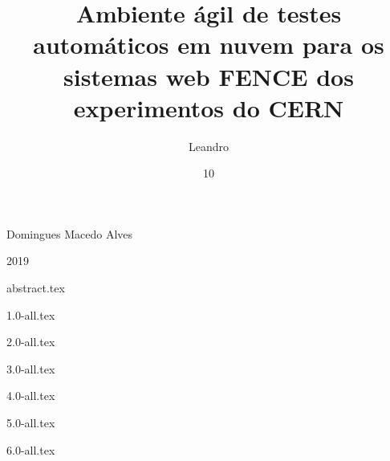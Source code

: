 \documentclass[grad,numbers]{style/coppe}
\begin{document}
  \title{Ambiente ágil de testes automáticos em nuvem para os sistemas web FENCE dos experimentos do CERN}
  \foreigntitle{}
  \author{Leandro}{Domingues Macedo Alves}

  
  \date{10}{2019}


  \maketitle

  \frontmatter
  
  \makecatalog
 
    
  
  {abstract.tex}

  \tableofcontents
  \listoffigures
  \printlosymbols
  \printloabbreviations

  \mainmatter

  {1.0-all.tex}
  
  {2.0-all.tex}
  
  {3.0-all.tex}

  {4.0-all.tex}

  {5.0-all.tex}

  {6.0-all.tex}

  \backmatter
  \nocite{*}
  \label{bibliografia}
  
\end{document}
